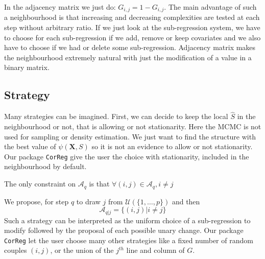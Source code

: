 \documentclass[12pt,a4paper]{report}
\begin{document}
In the adjacency matrix we just do: $G_{i,j}=1-G_{i,j}$. 
The main advantage of such a neighbourhood is that increasing and decreasing complexities are tested at each step without arbitrary ratio. If we just look at the sub-regression system, we have to choose for each sub-regression if we add, remove or keep covariates and we also have to choose if we had or delete some sub-regression. Adjacency matrix makes the neighbourhood extremely natural with just the modification of a value in a binary matrix.

		\subsection{Strategy}
			Many strategies can be imagined. First, we can decide to keep the local $\hat{S}$ in the neighbourhood or not, that is allowing or not stationarity. Here the MCMC is not used for sampling or density estimation. We just want to find the structure with the best value of $\psi(\boldsymbol{X},S)$ so it is not an evidence to allow or not stationarity. Our package {\tt CorReg} give the user the choice with stationarity,  included in the neighbourhood by default.
			

		The only constraint on $\mathcal{A}_q$ is that $\forall (i,j) \in \mathcal{A}_q, i\neq j$			
			
		We propose, for step $q$ to draw $j$ from $\mathcal{U}(\{1,\dots,p\})$ and then 
		\begin{equation}
			\mathcal{A}_{q|j}=\{ (i,j)|i \neq j \}
		\end{equation}
			Such a strategy can be interpreted as the uniform choice of a sub-regression to modify followed by the proposal of each possible unary change.
			Our package {\tt CorReg} let the user choose many other strategies like a fixed number of random couples $(i,j)$, or the union of the $j^{th}$ line and column of $G$.
\end{document}
